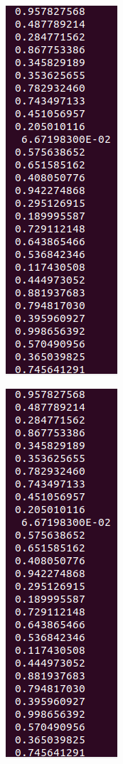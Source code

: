 \documentclass[12pt,a4paper]{article}
\begin{document}
\begin{enumerate}
    \begin{figure}[h!]
        \centering
        \includegraphics[scale=0.6]{3.3.PNG}
    \end{figure}
    
    \begin{figure}[h!]
        \centering
        \includegraphics[scale=0.6]{3.3.PNG}
    \end{figure}
    

\end{enumerate}
\end{document}
